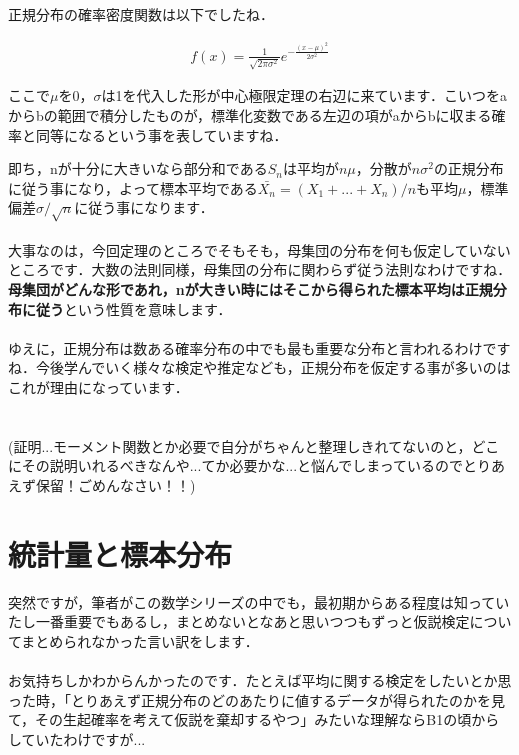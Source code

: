 \documentclass[11pt,a4paper,uplatex]{ujreport} 	%
\begin{document}
正規分布の確率密度関数は以下でしたね．

\begin{align}
  f(x) = \frac{1}{\sqrt{2\pi\sigma^2}}e^{-\frac{(x-\mu)^2}{2\sigma^2}}
\end{align}

ここで$\mu$を0，$\sigma$は1を代入した形が中心極限定理の右辺に来ています．こいつをaからbの範囲で積分したものが，標準化変数である左辺の項がaからbに収まる確率と同等になるという事を表していますね．

即ち，nが十分に大きいなら部分和である$S_n$は平均が$n\mu$，分散が$n\sigma^2$の正規分布に従う事になり，よって標本平均である$\bar{X_n}=(X_1+...+X_n)/n$も平均$\mu$，標準偏差$\sigma/\sqrt{n}$に従う事になります．\\
\\

大事なのは，今回定理のところでそもそも，母集団の分布を何も仮定していないところです．大数の法則同様，母集団の分布に関わらず従う法則なわけですね．\\

\textbf{母集団がどんな形であれ，nが大きい時にはそこから得られた標本平均は正規分布に従う}という性質を意味します．\\
\\

ゆえに，正規分布は数ある確率分布の中でも最も重要な分布と言われるわけですね．今後学んでいく様々な検定や推定なども，正規分布を仮定する事が多いのはこれが理由になっています．\\
\\
\\

(証明...モーメント関数とか必要で自分がちゃんと整理しきれてないのと，どこにその説明いれるべきなんや...てか必要かな...と悩んでしまっているのでとりあえず保留！ごめんなさい！！)


\chapter{統計量と標本分布}
突然ですが，筆者がこの数学シリーズの中でも，最初期からある程度は知っていたし一番重要でもあるし，まとめないとなあと思いつつもずっと仮説検定についてまとめられなかった言い訳をします．\\
\\

お気持ちしかわからんかったのです．たとえば平均に関する検定をしたいとか思った時，「とりあえず正規分布のどのあたりに値するデータが得られたのかを見て，その生起確率を考えて仮説を棄却するやつ」みたいな理解ならB1の頃からしていたわけですが...\\
\end{document}
